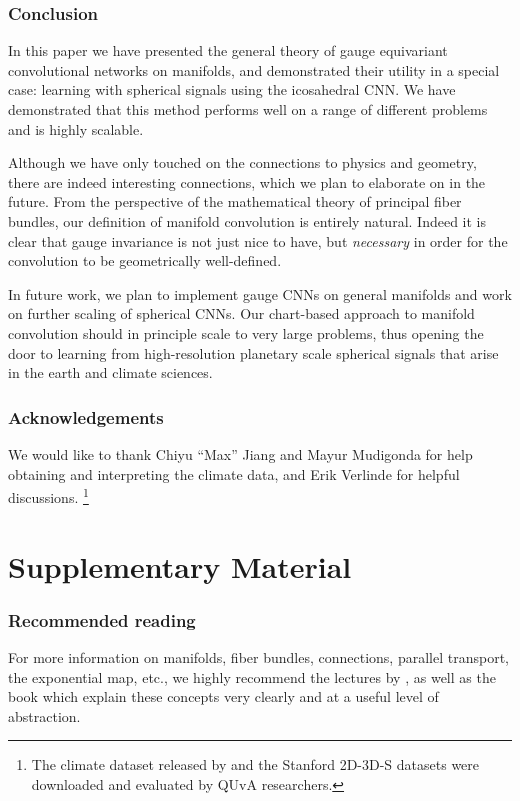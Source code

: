 \documentclass{article}
\newcommand\blfootnote[1]{\begingroup
  \renewcommand\thefootnote{}\footnote{#1}\addtocounter{footnote}{-1}\endgroup
}
\begin{document}
\section{Conclusion}

In this paper we have presented the general theory of gauge equivariant convolutional networks on manifolds, and demonstrated their utility in a special case: learning with spherical signals using the icosahedral CNN.
We have demonstrated that this method performs well on a range of different problems and is highly scalable.

Although we have only touched on the connections to physics and geometry, there are indeed interesting connections, which we plan to elaborate on in the future.
From the perspective of the mathematical theory of principal fiber bundles, our definition of manifold convolution is entirely natural.
Indeed it is clear that gauge invariance is not just nice to have, but \emph{necessary} in order for the convolution to be geometrically well-defined.

In future work, we plan to implement gauge CNNs on general manifolds and work on further scaling of spherical CNNs.
Our chart-based approach to manifold convolution should in principle scale to very large problems, thus opening the door to learning from high-resolution planetary scale spherical signals that arise in the earth and climate sciences.


\section*{Acknowledgements}
We would like to thank Chiyu ``Max'' Jiang and Mayur Mudigonda for help obtaining and interpreting the climate data, and Erik Verlinde for helpful discussions.
\blfootnote{The climate dataset released by \cite{jiangSphericalCNNsUnstructured2018} and the Stanford 2D-3D-S datasets were downloaded and evaluated by QUvA researchers.}




\newpage
\part*{Supplementary Material}

\section{Recommended reading}

For more information on manifolds, fiber bundles, connections, parallel transport, the exponential map, etc., we highly recommend the lectures by \citet{schullerLecturesGeometricalAnatomy2016}, as well as the book \citet{nakaharaGeometryTopologyPhysics2003} which explain these concepts very clearly and at a useful level of abstraction.
\end{document}
